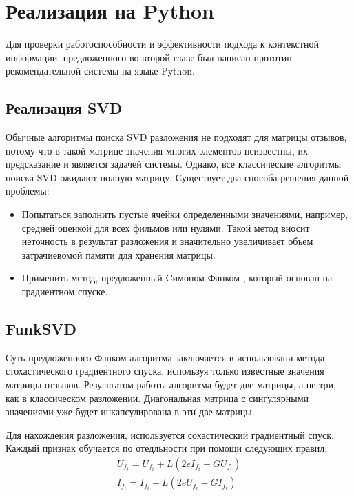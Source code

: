 
\section{Реализация на Python}

Для проверки работоспособности и эффективности подхода к контекстной информации, предложенного во второй главе был написан прототип рекомендательной системы на языке Python.

\subsection{Реализация SVD}

Обычные алгоритмы поиска SVD разложения не подходят для матрицы отзывов, потому что в такой матрице значения многих элементов неизвестны, их предсказание и является задачей системы. Однако, все классические алгоритмы поиска SVD ожидают полную матрицу. Существует два способа решения данной проблемы:

\begin{itemize}
\item Попытаться заполнить пустые ячейки определенными значениями, например, средней оценкой для всех фильмов или нулями. Такой метод вносит неточность в результат разложения и значительно увеличивает объем затрачиевомой памяти для хранения матрицы.
\item Применить метод, предложенный Cимоном Фанком \cite{Funk}, который основан на градиентном спуске.
\end{itemize}

\subsection{FunkSVD}

Суть предложенного Фанком алгоритма заключается в использовани метода стохастического градиентного спуска, используя только известные значения матрицы отзывов. Результатом работы алгоритма будет две матрицы, а не три, как в классическом разложении. Диагональная матрица с сингулярными значениями уже будет инкапсулирована в эти две матрицы.

Для нахождения разложения, используется сохастический градиентный спуск. Каждый признак обучается по отедльности при помощи следующих правил:
\begin{gather*}
    U_{f_i} = U_{f_i} + L(2eI_{f_i} - GU_{f_i}) \\
    I_{f_i} = I_{f_i} + L(2eU_{f_i} - GI_{f_i})
\end{gather*}

